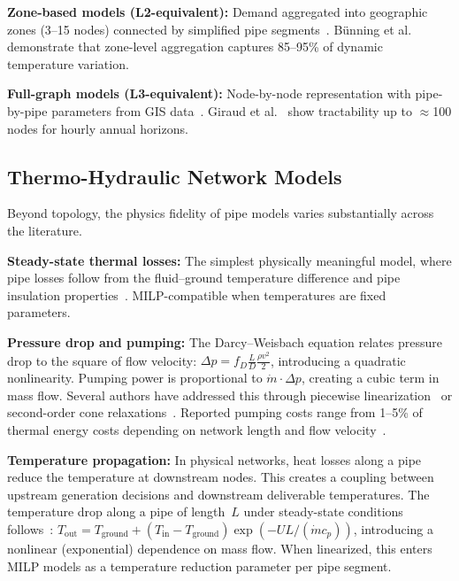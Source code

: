 \documentclass[review,3p]{elsarticle}
\begin{document}
\textbf{Zone-based models (L2-equivalent):} Demand aggregated into
geographic zones (3--15 nodes) connected by simplified pipe
segments~\cite{Wirtz2020,Mertz2016,Buffa2019}. Bünning et
al.~\cite{Buenning2020} demonstrate that zone-level aggregation
captures 85--95\% of dynamic temperature variation.

\textbf{Full-graph models (L3-equivalent):} Node-by-node
representation with pipe-by-pipe parameters from GIS
data~\cite{Vesterlund2017,Schweiger2017,vanderHeijde2017,
Blommaert2020}. Giraud et al.~\cite{Giraud2015} show tractability
up to $\approx$100 nodes for hourly annual horizons.

\subsection{Thermo-Hydraulic Network Models}
\label{sec:rw_thermohydraulic}

Beyond topology, the physics fidelity of pipe models varies
substantially across the literature.

\textbf{Steady-state thermal losses:} The simplest physically
meaningful model, where pipe losses follow from the
fluid--ground temperature difference and pipe insulation
properties~\cite{Paalsson1999,Frederiksen2013}. MILP-compatible
when temperatures are fixed parameters.

\textbf{Pressure drop and pumping:} The Darcy--Weisbach equation
relates pressure drop to the square of flow velocity:
$\Delta p = f_D \frac{L}{D} \frac{\rho v^2}{2}$, introducing a
quadratic nonlinearity. Pumping power is proportional to
$\dot{m} \cdot \Delta p$, creating a cubic term in mass flow.
Several authors have addressed this through piecewise
linearization~\cite{Bordin2016,Mertz2016} or second-order cone
relaxations~\cite{Blommaert2020}. Reported pumping costs range
from 1--5\% of thermal energy costs depending on network length
and flow velocity~\cite{Frederiksen2013}.

\textbf{Temperature propagation:} In physical networks, heat
losses along a pipe reduce the temperature at downstream nodes.
This creates a coupling between upstream generation decisions and
downstream deliverable temperatures. The temperature drop along
a pipe of length~$L$ under steady-state conditions
follows~\cite{vanderHeijde2017}:
$T_{\mathrm{out}} = T_{\mathrm{ground}} +
(T_{\mathrm{in}} - T_{\mathrm{ground}})
\exp(-U L / (\dot{m} c_p))$,
introducing a nonlinear (exponential) dependence on mass flow.
When linearized, this enters MILP models as a temperature reduction
parameter per pipe segment.
\end{document}
